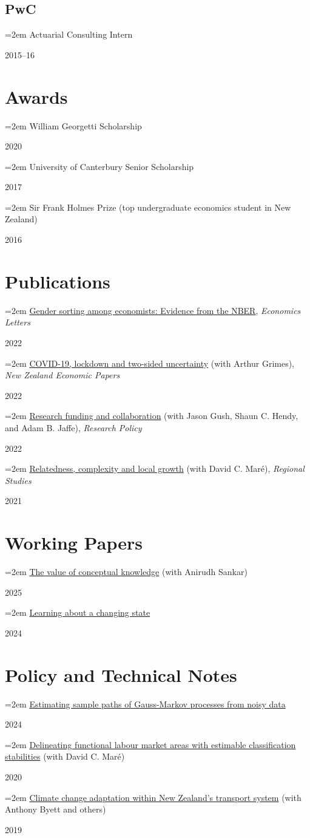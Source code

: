 \documentclass[11pt,oneside]{memoir}
\newcommand{\entry}[2]{\par\parbox[t]{0.9\linewidth}{\strut\raggedright\hangindent=2em #2\strut}\hfill#1}
\begin{document}
\subsection{PwC}
\entry{2015--16}{Actuarial Consulting Intern}

\section{Awards}

\entry{2020}{William Georgetti Scholarship}
\entry{2017}{University of Canterbury Senior Scholarship}
\entry{2016}{Sir Frank Holmes Prize (top undergraduate economics student in New Zealand)}

\section{Publications}

\entry{2022}{\href{https://doi.org/10.1016/j.econlet.2022.110640}{Gender sorting among economists: Evidence from the NBER}, \emph{Economics Letters}}
\entry{2022}{\href{https://doi.org/10.1080/00779954.2020.1806340}{COVID-19, lockdown and two-sided uncertainty} (with Arthur Grimes), \emph{New Zealand Economic Papers}}
\entry{2022}{\href{https://doi.org/10.1016/j.respol.2021.104421}{Research funding and collaboration} (with Jason Gush, Shaun C. Hendy, and Adam B. Jaffe), \emph{Research Policy}}
\entry{2021}{\href{https://doi.org/10.1080/00343404.2020.1802418}{Relatedness, complexity and local growth} (with David C. Maré), \emph{Regional Studies}}

\section{Working Papers}

\entry{2025}{\href{https://arxiv.org/abs/2509.09170}{The value of conceptual knowledge} (with Anirudh Sankar)}
\entry{2024}{\href{https://arxiv.org/abs/2401.03607}{Learning about a changing state}}

\section{Policy and Technical Notes}

\entry{2024}{\href{https://arxiv.org/abs/2404.00784}{Estimating sample paths of Gauss-Markov processes from noisy data}}
\entry{2020}{\href{https://www.iza.org/publications/dp/13642}{Delineating functional labour market areas with estimable classification stabilities} (with David C. Maré)}
\entry{2019}{\href{https://motu.nz/assets/Documents/our-work/environment/climate-change-impacts/Transport-Dialogue-Report.pdf}{Climate change adaptation within New Zealand's transport system} (with Anthony Byett and others)}
\end{document}
